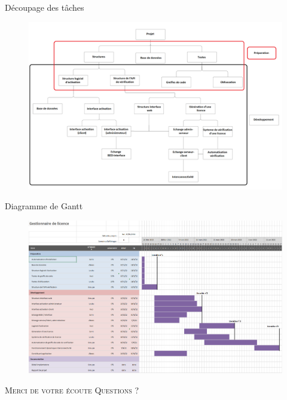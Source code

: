 \documentclass{cubeamer}
\begin{document}
\begin{frame}{Découpage des tâches}
    \begin{figure}
        \centering
        \includegraphics[scale=0.18]{img/organi.png}
    \end{figure}
\end{frame}

\begin{frame}{Diagramme de Gantt}
    \begin{figure}
        \centering
        \includegraphics[scale=0.22]{img/Gantt.png}
    \end{figure}
\end{frame}

\begin{frame}[standout]
    \Huge\textsc{Merci de votre écoute}
    \vfill
    \LARGE\textsc{Questions ?}
\end{frame}
\end{document}
